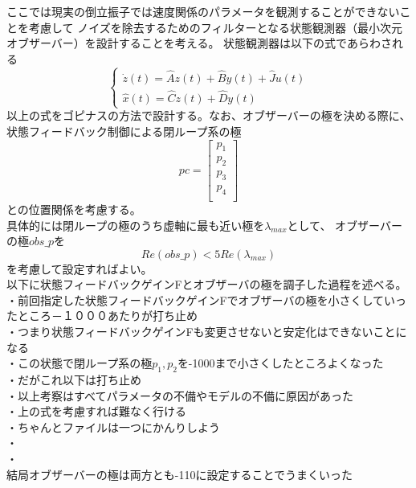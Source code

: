 \documentclass{jarticle}
\begin{document}
\begin{enumerate}
\begin{enumerate}
\begin{enumerate}
					ここでは現実の倒立振子では速度関係のパラメータを観測することができないことを考慮して
					ノイズを除去するためのフィルターとなる状態観測器（最小次元オブザーバー）を設計することを考える。
					状態観測器は以下の式であらわされる
					\begin{equation}
						\left\{
						\begin{array}{l}
							\dot{z}(t) = \widehat{A}z(t) + \widehat{B}y(t) + \widehat{J}u(t) \\
							\widehat{x}(t) = \widehat{C}z(t) + \widehat{D}y(t)
						\end{array}
						\right.
					\end{equation}
					以上の式をゴピナスの方法で設計する。なお、オブザーバーの極を決める際に、
					状態フィードバック制御による閉ループ系の極
					\begin{equation}
						pc=\left[
						\begin{array}{c}
							p_{1}\\
							p_{2}\\
							p_{3}\\
							p_{4}\\
						\end{array}
						\right]
					\end{equation}
					との位置関係を考慮する。\\
					具体的には閉ループの極のうち虚軸に最も近い極を$\lambda_{max}$として、
					オブザーバーの極$obs\_p$を
					\begin{equation}
						Re(obs\_p)<5Re(\lambda_{max})
					\end{equation}
					を考慮して設定すればよい。\\
					以下に状態フィードバックゲインFとオブザーバの極を調子した過程を述べる。\\
					・前回指定した状態フィードバックゲインFでオブザーバの極を小さくしていったところ－１０００あたりが打ち止め\\
					・つまり状態フィードバックゲインFも変更させないと安定化はできないことになる\\
					・この状態で閉ループ系の極$p_{1},p_{2}$を-1000まで小さくしたところよくなった\\
					・だがこれ以下は打ち止め\\
					・以上考察はすべてパラメータの不備やモデルの不備に原因があった\\
					・上の式を考慮すれば難なく行ける\\
					・ちゃんとファイルは一つにかんりしよう\\
					・\\
					・\\	
					結局オブザーバーの極は両方とも-110に設定することでうまくいった\\
								

\end{enumerate}
\end{enumerate}
\end{enumerate}
\end{document}
